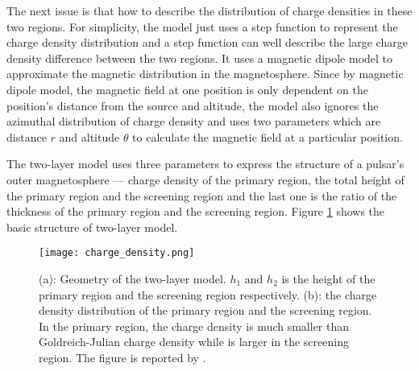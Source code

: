 \documentclass[a4paper, 12pt]{report}
\newcommand{\singleFig}[3]{
  \begin{figure}[!htp]
    \centering
    \texttt{[image: \#1]}
    \caption{#3}
    \label{fig: #1}
  \end{figure}
}
\begin{document}
    The next issue is that how to describe the distribution of charge densities in these two 
    regions. For simplicity, the model just uses a step function to represent the charge 
    density distribution and a step function can well describe the large charge density 
    difference between the two regions. It uses a magnetic dipole model to approximate the 
    magnetic distribution in the magnetosphere. Since by magnetic dipole model, the magnetic 
    field at one position is only dependent on the position's distance from the source 
    and altitude, the model also ignores the azimuthal distribution of charge density 
    and uses two parameters which are distance $r$ and altitude $\theta$ to calculate the 
    magnetic field at a particular position.

    The two-layer model uses three parameters to express the structure of a pulsar's outer 
    magnetosphere --- charge density of the primary region, the total height of the primary 
    region and the screening region and the last one is the ratio of the thickness of the 
    primary region and the screening region. Figure \ref{fig: charge_density} shows the 
    basic structure of two-layer model. 

    \begin{figure}[!htp]
      \centering 
      \texttt{[image: charge\_density.png]}
      \caption[Geometry and charge density distribution of the two-layer model.]
        {(a): Geometry of the two-layer model. $h_{1}$ and 
        $h_{2}$ is the height of the primary region and the screening region respectively. 
        (b): the charge density distribution of the primary region and the screening region. 
        In the primary region, the charge density is much smaller than Goldreich-Julian charge 
        density while is larger in the screening region. The figure is reported by
        \citet{0004-637X-720-1-178}.}
      \label{fig: charge_density}
    \end{figure}
\end{document}

